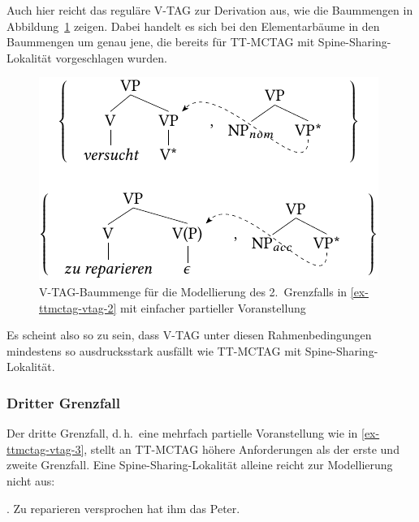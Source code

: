 Auch hier reicht das reguläre V-TAG zur Derivation aus, wie die Baummengen in Abbildung~\ref{fig-ttmctag-vtag-2} zeigen. Dabei handelt es sich bei den Elementarbäume in den Baummengen um genau jene, die bereits für TT-MCTAG mit Spine-Sharing-Lokalität vorgeschlagen wurden.

\begin{figure}[t]
\centering
\includegraphics{graphics/abb742.pdf}
\caption{\label{fig-ttmctag-vtag-2}V-TAG-Baummenge für die Modellierung des 2.~Grenzfalls in \ref{ex-ttmctag-vtag-2} mit einfacher partieller Voranstellung}
\end{figure}

Es scheint also so zu sein, dass V-TAG unter diesen Rahmenbedingungen mindestens so ausdrucksstark ausfällt wie TT-MCTAG mit Spine-Sharing-Lokalität. 



\subsubsection*{Dritter Grenzfall}

Der dritte Grenzfall, d.\,h.\ eine mehrfach partielle Voranstellung wie in \ref{ex-ttmctag-vtag-3}, stellt an TT-MCTAG höhere Anforderungen als der erste und zweite Grenzfall. Eine Spine-Sharing-Loka\-li\-tät alleine reicht zur Modellierung nicht aus:

\ex. Zu reparieren versprochen hat ihm das Peter. \label{ex-ttmctag-vtag-3}


